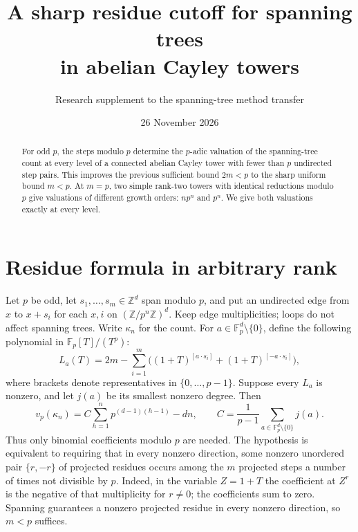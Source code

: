 \documentclass[11pt]{article}
\title{\vspace{-2em}A sharp residue cutoff for spanning trees\\ in abelian Cayley towers}
\author{Research supplement to the spanning-tree method transfer}
\date{26 November 2026}
\newcommand{\F}{\mathbb F}
\newcommand{\Z}{\mathbb Z}
\newcommand{\val}{v_p}
\begin{document}
\maketitle
\begin{abstract}
For odd \(p\), the steps modulo \(p\) determine the \(p\)-adic valuation of
the spanning-tree count at every level of a connected abelian Cayley tower
with fewer than \(p\) undirected step pairs. This improves the previous
sufficient bound \(2m<p\) to the sharp uniform bound \(m<p\).
At \(m=p\), two simple rank-two towers with identical reductions modulo \(p\)
give valuations of different growth orders: \(np^n\) and \(p^n\).
We give both valuations exactly at every level.
\end{abstract}

\section{Residue formula in arbitrary rank}
Let \(p\) be odd, let \(s_1,\ldots,s_m\in\Z^d\) span modulo \(p\), and put
an undirected edge from \(x\) to \(x+s_i\) for each \(x,i\) on
\((\Z/p^n\Z)^d\). Keep edge multiplicities; loops do not affect spanning
trees. Write \(\kappa_n\) for the count. For \(a\in\F_p^d\setminus\{0\}\),
define the following polynomial in \(\F_p[T]/(T^p)\):
\[
 L_a(T)=2m-\sum_{i=1}^m
 \big((1+T)^{[a\cdot s_i]}+(1+T)^{[-a\cdot s_i]}\big),
\]
where brackets denote representatives in \(\{0,\ldots,p-1\}\).
Suppose every \(L_a\) is nonzero, and let \(j(a)\) be its smallest nonzero
degree. Then
\begin{equation}
 \val(\kappa_n)=C\sum_{h=1}^n p^{(d-1)(h-1)}-dn,\qquad
 C=\frac{1}{p-1}\sum_{a\in\F_p^d\setminus\{0\}}j(a).
 \label{main}
\end{equation}
Thus only binomial coefficients modulo \(p\) are needed. The hypothesis is
equivalent to requiring that in every nonzero direction, some nonzero
unordered pair \(\{r,-r\}\) of projected residues occurs among the \(m\)
projected steps a number of times not divisible by \(p\).
Indeed, in the variable \(Z=1+T\) the coefficient at \(Z^r\) is the
negative of that multiplicity for \(r\ne0\); the coefficients sum to zero.
Spanning guarantees a nonzero projected residue in every nonzero
direction, so \(m<p\) suffices.
\end{document}
